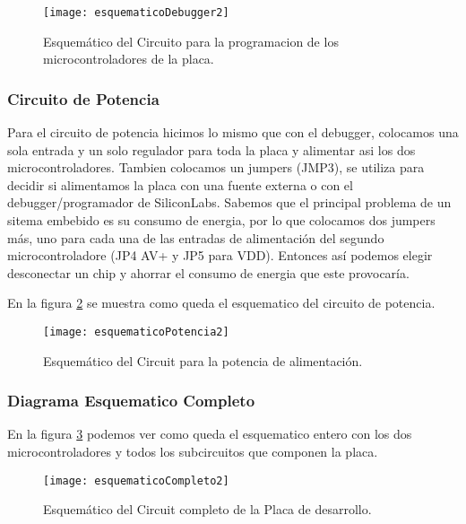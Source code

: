 \begin{figure}  [H]
\centering
  \texttt{[image: esquematicoDebugger2]}
  \caption{Esquemático del Circuito para la programacion de los microcontroladores de la placa.}\label{fig:esquematicoDebugger2}
\end{figure}



\subsubsection{Circuito de Potencia}
\label{subsub: circuito_potencia2}

Para el circuito de potencia hicimos lo mismo que con el debugger, colocamos una sola entrada y un solo regulador para toda la placa y alimentar asi los dos microcontroladores. Tambien colocamos un jumpers (JMP3), se utiliza para decidir si alimentamos la placa con una fuente externa o con el debugger/programador de SiliconLabs. 
Sabemos que el principal problema de un sitema embebido es su consumo de energia, por lo que colocamos dos jumpers más, uno para cada una de las entradas de alimentación del segundo microcontroladore (JP4 AV+ y JP5 para VDD). Entonces así podemos elegir desconectar un chip y ahorrar el consumo de energia que este provocaría. 

En la figura \ref{fig:esquematicoPotencia2} se muestra como queda el esquematico del circuito de potencia.

\begin{figure}[H] 
\centering
  \texttt{[image: esquematicoPotencia2]}
  \caption{Esquemático del Circuit para la potencia de alimentación.}\label{fig:esquematicoPotencia2}
\end{figure}


\subsubsection{Diagrama Esquematico Completo}
\label{subsubsection: esquematico_completo2}

En la figura \ref{fig:esquematicoCompleto2} podemos ver como queda el esquematico entero con los dos microcontroladores y todos los subcircuitos que componen la placa.

\begin{figure}  
\centering
  \texttt{[image: esquematicoCompleto2]}
  \caption{Esquemático del Circuit completo de la Placa de desarrollo.}\label{fig:esquematicoCompleto2}
\end{figure}



